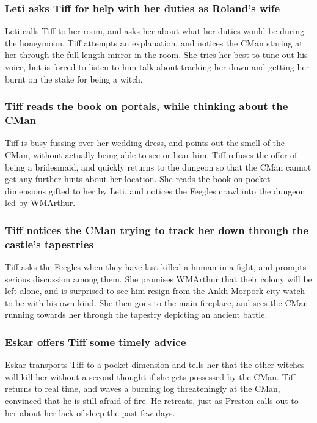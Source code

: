 \subsubsection{\Gls{Leti} asks \Gls{Tiff} for help with her duties as \Gls{Roland}'s wife}
\Gls{Leti} calls \Gls{Tiff} to her room, and asks her about what her duties would be during the
honeymoon. \Gls{Tiff} attempts an explanation, and notices the \Gls{CMan} staring at her through
the full-length mirror in the room. She tries her best to tune out his voice, but is forced to
listen to him talk about tracking her down and getting her burnt on the stake for being a witch.

\subsubsection{\Gls{Tiff} reads the book on portals, while thinking about the \Gls{CMan}}
\Gls{Tiff} is busy fussing over her wedding dress, and points out the smell of the \Gls{CMan},
without actually being able to see or hear him. \Gls{Tiff} refuses the offer of being a bridesmaid,
and quickly returns to the dungeon so that the \Gls{CMan} cannot get any further hints about her
location. She reads the book on pocket dimensions gifted to her by \Gls{Leti}, and notices the
Feegles crawl into the dungeon led by \Gls{WMArthur}.

\subsubsection{\Gls{Tiff} notices the \Gls{CMan} trying to track her down through the castle's
    tapestries}
\Gls{Tiff} asks the Feegles when they have last killed a human in a fight, and prompts serious
discussion among them. She promises \Gls{WMArthur} that their colony will be left alone, and is
surprised to see him resign from the Ankh-Morpork city watch to be with his own kind. She then goes
to the main fireplace, and sees the \Gls{CMan} running towards her through the tapestry depicting
an ancient battle.

\subsubsection{\Gls{Eskar} offers \Gls{Tiff} some timely advice}
\Gls{Eskar} transports \Gls{Tiff} to a pocket dimension and tells her that the other witches will
kill her without a second thought if she gets possessed by the \Gls{CMan}. \Gls{Tiff} returns to
real time, and waves a burning log threateningly at the \Gls{CMan}, convinced that he is still
afraid of fire. He retreats, just as \Gls{Preston} calls out to her about her lack of sleep the past
few days.

